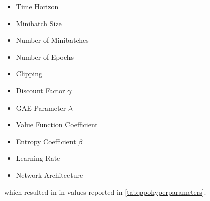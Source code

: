 \begin{itemize}
    \item Time Horizon
    \item Minibatch Size
    \item Number of Minibatches
    \item Number of Epochs
    \item Clipping
    \item Discount Factor $\gamma$
    \item GAE Parameter $\lambda$
    \item Value Function Coefficient
    \item Entropy Coefficient $\beta$
    \item Learning Rate
    \item Network Architecture
\end{itemize}

which resulted in in values reported in \cref{tab:ppohyperparameters}.


